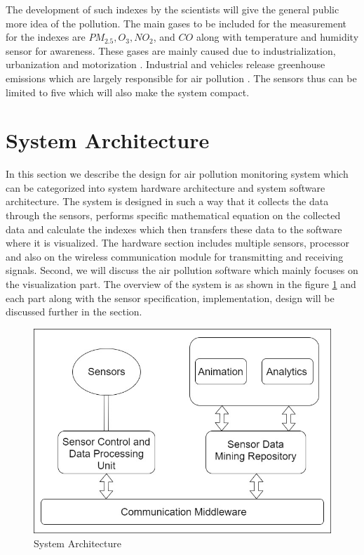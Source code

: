 The development of such indexes by the scientists will give the general public more idea of the pollution. The main gases to be included for the measurement for the indexes are  $PM_{2.5}, O_3, NO_2$, and $CO$ along with temperature and humidity sensor for awareness. These gases are mainly caused due to industrialization, urbanization and motorization \cite{Saha1952}. Industrial and vehicles release greenhouse emissions which are largely responsible for air pollution \cite{ internet}. The sensors thus can be limited to five which will also make the system compact.

\section{System Architecture}
    
     In this section we describe the design for air pollution monitoring system which can be categorized into system hardware architecture and system software architecture. The system is designed in such a way that it collects the data through the sensors, performs specific mathematical equation on the collected data and calculate the indexes which then transfers these data to the software where it is visualized. The hardware section includes multiple sensors, processor and also on the wireless communication module for transmitting and receiving signals. Second, we will discuss the air pollution software which mainly focuses on the visualization part. The overview of the system is as shown in the figure \ref{overview} and each part along with the sensor specification, implementation, design will be discussed further in the section. 


     \begin{figure}[h]
      \begin{center}
      \includegraphics[scale=0.70]{images/figure2.png}
      \end{center}
      \caption{System Architecture}
      \label{overview}
  
    \end{figure}



